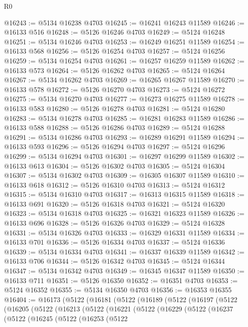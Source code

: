 \begin{lexlean}{R0}
\begin{coremodule}
@16243 := @5134 @16238 @4703
@16245 := @16241 @16243 @11589
@16246 := @16133 @516
@16248 := @5126 @16246 @4703
@16249 := @5124 @16248
@16251 := @5134 @16246 @4703
@16253 := @16249 @16251 @11589
@16254 := @16133 @568
@16256 := @5126 @16254 @4703
@16257 := @5124 @16256
@16259 := @5134 @16254 @4703
@16261 := @16257 @16259 @11589
@16262 := @16133 @573
@16264 := @5126 @16262 @4703
@16265 := @5124 @16264
@16267 := @5134 @16262 @4703
@16269 := @16265 @16267 @11589
@16270 := @16133 @578
@16272 := @5126 @16270 @4703
@16273 := @5124 @16272
@16275 := @5134 @16270 @4703
@16277 := @16273 @16275 @11589
@16278 := @16133 @583
@16280 := @5126 @16278 @4703
@16281 := @5124 @16280
@16283 := @5134 @16278 @4703
@16285 := @16281 @16283 @11589
@16286 := @16133 @588
@16288 := @5126 @16286 @4703
@16289 := @5124 @16288
@16291 := @5134 @16286 @4703
@16293 := @16289 @16291 @11589
@16294 := @16133 @593
@16296 := @5126 @16294 @4703
@16297 := @5124 @16296
@16299 := @5134 @16294 @4703
@16301 := @16297 @16299 @11589
@16302 := @16133 @613
@16304 := @5126 @16302 @4703
@16305 := @5124 @16304
@16307 := @5134 @16302 @4703
@16309 := @16305 @16307 @11589
@16310 := @16133 @618
@16312 := @5126 @16310 @4703
@16313 := @5124 @16312
@16315 := @5134 @16310 @4703
@16317 := @16313 @16315 @11589
@16318 := @16133 @691
@16320 := @5126 @16318 @4703
@16321 := @5124 @16320
@16323 := @5134 @16318 @4703
@16325 := @16321 @16323 @11589
@16326 := @16133 @696
@16328 := @5126 @16326 @4703
@16329 := @5124 @16328
@16331 := @5134 @16326 @4703
@16333 := @16329 @16331 @11589
@16334 := @16133 @701
@16336 := @5126 @16334 @4703
@16337 := @5124 @16336
@16339 := @5134 @16334 @4703
@16341 := @16337 @16339 @11589
@16342 := @16133 @706
@16344 := @5126 @16342 @4703
@16345 := @5124 @16344
@16347 := @5134 @16342 @4703
@16349 := @16345 @16347 @11589
@16350 := @16133 @711
@16351 := @5126 @16350
@16352 := @16351 @4703
@16353 := @5124 @16352
@16355 := @5134 @16350 @4703
@16356 := @16353 @16355
@16404 := @16173
    (@5122
      (@16181
        (@5122
          (@16189
            (@5122
              (@16197
                (@5122
                  (@16205
                    (@5122
                      (@16213
                        (@5122
                          (@16221
                            (@5122
                              (@16229
                                (@5122
                                  (@16237
                                    (@5122
                                      (@16245
                                        (@5122
                                          (@16253
                                            (@5122

\end{coremodule}
\end{lexlean}
